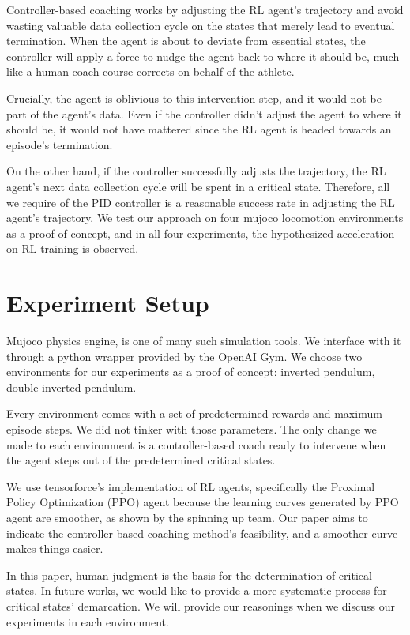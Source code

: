 Controller-based coaching works by adjusting the RL agent's trajectory and avoid wasting valuable data collection cycle on the states that merely lead to eventual termination. When the agent is about to deviate from essential states, the controller will apply a force to nudge the agent back to where it should be, much like a human coach course-corrects on behalf of the athlete. 

Crucially, the agent is oblivious to this intervention step, and it would not be part of the agent's data. Even if the controller didn't adjust the agent to where it should be, it would not have mattered since the RL agent is headed towards an episode's termination. 

On the other hand, if the controller successfully adjusts the trajectory, the RL agent's next data collection cycle will be spent in a critical state. Therefore, all we require of the PID controller is a reasonable success rate in adjusting the RL agent's trajectory. We test our approach on four mujoco locomotion environments as a proof of concept, and in all four experiments, the hypothesized acceleration on RL training is observed.

\section{Experiment Setup}
Mujoco physics engine\cite{6386109}, is one of many such simulation tools. We interface with it through a python wrapper provided by the OpenAI Gym\cite{Brockman2016OpenAIG}. We choose two environments for our experiments as a proof of concept: inverted pendulum, double inverted pendulum. 

Every environment comes with a set of predetermined rewards and maximum episode steps. We did not tinker with those parameters. The only change we made to each environment is a controller-based coach ready to intervene when the agent steps out of the predetermined critical states.

We use tensorforce's\cite{tensorforce} implementation of RL agents, specifically the Proximal Policy Optimization (PPO) agent because the learning curves generated by PPO agent are smoother, as shown by the spinning up\cite{SpinningUp2018} team. Our paper aims to indicate the controller-based coaching method's feasibility, and a smoother curve makes things easier. 

In this paper, human judgment is the basis for the determination of critical states. In future works, we would like to provide a more systematic process for critical states' demarcation. We will provide our reasonings when we discuss our experiments in each environment. 

